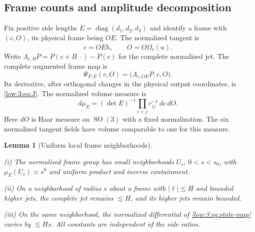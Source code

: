 \documentclass[11pt]{amsart}
\newtheorem{lemma}[theorem]{Lemma}
\theoremstyle{definition}
\theoremstyle{remark}
\newcommand{\abs}[1]{\lvert #1\rvert}
\DeclareMathOperator{\diag}{diag}
\numberwithin{equation}{section}
\begin{document}
\subsection{Frame counts and amplitude decomposition}\label{cubic:assembly}\label{low:3:sec:counting}\label{low:3:sec:resolution}\label{low:3:sec:assembly}

Fix positive side lengths $E=\diag(d_1,d_2,d_3)$ and identify a frame with $(c,O)$, its physical frame being $OE$. The normalized tangent is
\[
\dot c=OEh,\qquad \dot O=O\Omega_r(u).
\]
Write $\Lambda_{c,B}P=P(c+B\,\cdot)-P(c)$ for the complete normalized jet. The complete augmented frame map is
\begin{equation}\label{low:3:eq:state-map}
\Psi_{P,E}(c,O)=\bigl(\Lambda_{c,OE}P,c,O\bigr).
\end{equation}
Its derivative, after orthogonal changes in the physical output coordinates, is \eqref{low:3:eq:J}. The normalized volume measure is
\begin{equation}\label{low:3:eq:haar}
d\mu_E=(\det E)^{-1}\prod_{i<j}r_{ij}^{-1}\,dc\,dO.
\end{equation}
Here $dO$ is Haar measure on $\operatorname{SO}(3)$ with a fixed normalization. The six normalized tangent fields have volume comparable to one for this measure.

\begin{lemma}[Uniform local frame neighborhoods]\label{low:3:lem:state-neighborhoods}

\noindent\textup{(i)} The normalized frame group has small neighborhoods $U_s$, $0<s<s_0$, with $\mu_E(U_s)\asymp s^6$ and uniform product and inverse containment.

\noindent\textup{(ii)} On a neighborhood of radius $s$ about a frame with $\abs\ell\leq H$ and bounded higher jets, the complete jet remains $\lesssim H$, and its higher jets remain bounded.

\noindent\textup{(iii)} On the same neighborhood, the normalized differential of \eqref{low:3:eq:state-map} varies by $\lesssim Hs$. All constants are independent of the side ratios.
\end{lemma}
\end{document}
